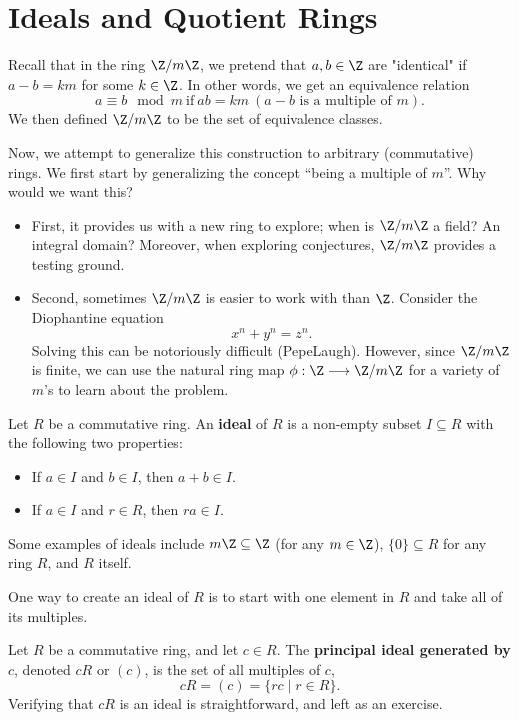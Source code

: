 \documentclass[math1530-lecture-notes]{subfiles}
\begin{document}
\section{Ideals and Quotient Rings}
Recall that in the ring $\Z / m\Z$, we pretend that $a,b\in \Z$ are "identical" if $a-b=km$ for some
$k\in \Z$. In other words, we get an equivalence relation \[
  a\equiv b\mod{m} ~\text{if}~ ab=km~(\text{$a-b$ is a multiple of $m$})
.\] We then defined $\Z / m\Z$ to be the set of equivalence classes.

Now, we attempt to generalize this construction to arbitrary (commutative) rings. We first start by
generalizing the concept ``being a multiple of $m$''. Why would we want this? 
\begin{itemize}
  \item First, it provides us with a new ring to explore; when is $\Z / m\Z$ a field? An integral
    domain? Moreover, when exploring conjectures, $\Z /m\Z$ provides a testing ground.
  \item Second, sometimes $\Z / m\Z$ is easier to work with than $\Z$. Consider the Diophantine
    equation \[
      x^{n}+y^{n}=z^{n}
    .\] Solving this can be notoriously difficult (PepeLaugh). However, since $\Z / m\Z$ is finite,
    we can use the natural ring map $\phi:\Z \longrightarrow \Z/m\Z$ for a variety of $m$'s to learn
    about the problem.
\end{itemize}

\begin{definition}[Ideals]{}
  Let $R$ be a commutative ring. An \textbf{ideal} of $R$ is a non-empty subset $I\subseteq R$ with
  the following two properties:
  \begin{itemize}
    \item If $a \in I$ and $b\in I$, then $a+b\in I$.
    \item If $a \in I$ and $r\in R$, then $ra\in I$.
  \end{itemize}
\end{definition}

Some examples of ideals include $m\Z\subseteq \Z$ (for any $m\in \Z$), $\{ 0 \}\subseteq R$ for any
ring $R$, and $R$ itself.

One way to create an ideal of $R$ is to start with one element in $R$ and take all of its multiples.
\begin{definition}{}
  Let $R$ be a commutative ring, and let $c\in R$. The \textbf{principal ideal generated by $c$},
  denoted $cR$ or $(c)$, is the set of all multiples of $c$, \[
    cR = (c) = \{rc\mid r\in R\} 
  .\] Verifying that $cR$ is an ideal is straightforward, and left as an exercise. 
\end{definition}
\end{document}
